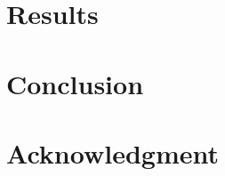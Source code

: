 \documentclass[lettersize,journal]{IEEEtran}
\begin{document}
\section{Results}
\label{sec:results}


\section{Conclusion}
\label{sec:conclusion}



\section*{Acknowledgment}
\label{sec:acknowledgment}





\newpage

\vfill
\end{document}
